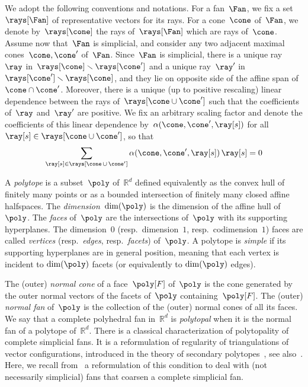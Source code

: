 \documentclass{amsart}
\theoremstyle{definition}
\newcommand{\R}{\mathbb{R}} %
\newcommand{\ssm}{\smallsetminus} %
\newcommand{\darkblue}{\color{darkblue}} %
\newcommand{\defn}[1]{\textsl{\darkblue #1}} %
\newcommand{\coefficient}{\alpha} %
\begin{document}
We adopt the following conventions and notations.
For a fan~$\Fan$, we fix a set~$\rays[\Fan]$ of representative vectors for its rays.
For a cone~$\cone$ of~$\Fan$, we denote by~$\rays[\cone]$ the rays of~$\rays[\Fan]$ which are rays of~$\cone$.
Assume now that~$\Fan$ is simplicial, and consider any two adjacent maximal cones~$\cone, \cone'$ of~$\Fan$.
Since~$\Fan$ is simplicial, there is a unique ray~$\ray$ in~$\rays[\cone] \ssm \rays[\cone']$ and a unique ray~$\ray'$ in~$\rays[\cone'] \ssm \rays[\cone]$, and they lie on opposite side of the affine span of~$\cone \cap \cone'$.
Moreover, there is a unique (up to positive rescaling) linear dependence between the rays of~$\rays[\cone \cup \cone']$ such that the coefficients of~$\ray$ and~$\ray'$ are positive.
We fix an arbitrary scaling factor and denote the coefficients of this linear dependence by~$\coefficient(\cone, \cone', \ray[s])$ for all~$\ray[s] \in \rays[\cone \cup \cone']$, so that
\[
\sum_{\ray[s] \in \rays[\cone \,\cup\, \cone']} \coefficient(\cone, \cone', \ray[s]) \, \ray[s] = 0
\]

A \defn{polytope} is a subset~$\poly$ of~$\R^d$ defined equivalently as the convex hull of finitely many points or as a bounded intersection of finitely many closed affine halfspaces.
The \defn{dimension}~$\dim(\poly)$ is the dimension of the affine hull of~$\poly$.
The \defn{faces} of~$\poly$ are the intersections of~$\poly$ with its supporting hyperplanes.
The dimension~$0$ (resp.~dimension~$1$, resp.~codimension~$1$) faces are called \defn{vertices} (resp.~\defn{edges}, resp.~\defn{facets}) of~$\poly$.
A polytope is \defn{simple} if its supporting hyperplanes are in general position, meaning that each vertex is incident to $\dim(\poly)$ facets (or equivalently to $\dim(\poly)$ edges).

The (outer) \defn{normal cone} of a face~$\poly[F]$ of~$\poly$ is the cone generated by the outer normal vectors of the facets of~$\poly$ containing~$\poly[F]$.
The (outer) \defn{normal fan} of~$\poly$ is the collection of the (outer) normal cones of all its faces.
We say that a complete polyhedral fan in~$\R^d$ is \defn{polytopal} when it is the normal fan of a polytope of~$\R^d$.
There is a classical characterization of polytopality of complete simplicial fans.
It is a reformulation of regularity of triangulations of vector configurations, introduced in the theory of secondary polytopes~\cite[Chap.~7]{GelfandKapranovZelevinsky}, see also~\cite[Chap.~5]{DeLoeraRambauSantos}.
Here, we recall from~\cite{PilaudSantos-quotientopes} a reformulation of this condition to deal with (not necessarily simplicial) fans that coarsen a complete simplicial fan.
\end{document}
